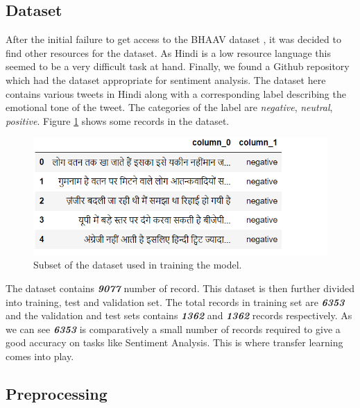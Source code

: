 \documentclass[a4paper, 12pt]{article}
\begin{document}
\begin{sloppypar}
\subsection{Dataset}

After the initial failure to get access to the BHAAV dataset\cite{kumar_bhaav_2019}
 , it was decided to find other resources for the dataset. As Hindi is a low resource language this seemed to be a very difficult task at hand. Finally, we found a Github repository\cite{sinha_sid573hindi_sentiment_analysis_2021}
 which had the dataset appropriate for sentiment analysis. The dataset here contains various tweets in Hindi along with a corresponding label describing the emotional tone of the tweet. The categories of the label are \textit{negative}, \textit{neutral}, \textit{positive}. Figure \ref{dataset} shows some records in the dataset.
 
 \begin{figure}[H]
 \begin{center}
 \includegraphics[scale=0.8]{dataset.png}
 \caption{ Subset of the dataset used in training the model.\label{dataset}}
 \end{center}
 \end{figure}
 
 The dataset contains \textit{\textbf{9077}} number of record. This dataset is then further divided into training, test and validation set. The total records in training set are \textit{\textbf{6353}} and the validation and test sets contains \textit{\textbf{1362}} and \textit{\textbf{1362}} records respectively. As we can see \textit{\textbf{6353}} is comparatively a small number of records required to give a good accuracy on tasks like Sentiment Analysis. This is where transfer learning comes into play.
 
 \subsection{Preprocessing}
 

\end{sloppypar}
\end{document}
